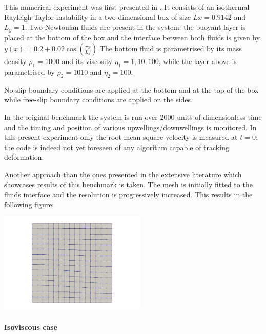 

This numerical experiment was first presented in \cite{vaks97}.
It consists of an isothermal Rayleigh-Taylor instability in a two-dimensional box
of size $Lx=0.9142$ and $L_y=1$.
Two Newtonian fluids are present in the system: the buoyant layer is placed at the bottom of 
the box and the interface between both fluids is given by 
$
y(x)=0.2+0.02\cos \left( \frac{\pi x}{L_x}  \right)
$
The bottom fluid is parametrised by its mass density $\rho_1=1000$ and its viscosity $\eta_1=1,10,100$, 
while the layer above is parametrised by $\rho_2=1010$ and $\eta_2=100$.

No-slip boundary conditions are applied at the bottom and at the top of the box 
while free-slip boundary conditions are applied on the sides. 

In the original benchmark the system is run over 2000 units of dimensionless time and the 
timing and position of various upwellings/downwellings is monitored. 
In this present experiment only the root mean square velocity is measured at $t=0$:
the code is indeed not yet foreseen of any algorithm capable of tracking deformation.

Another approach than the ones presented in the extensive literature which showcases 
results of this benchmark is taken. The mesh is initially fitted to the fluids
interface and the resolution is progressively increased. This results in the 
following figure:

\begin{center}
\includegraphics[width=7cm]{python_codes/fieldstone_25/results/100_100/grid}
\end{center}

\newpage
\paragraph{Isoviscous case}

